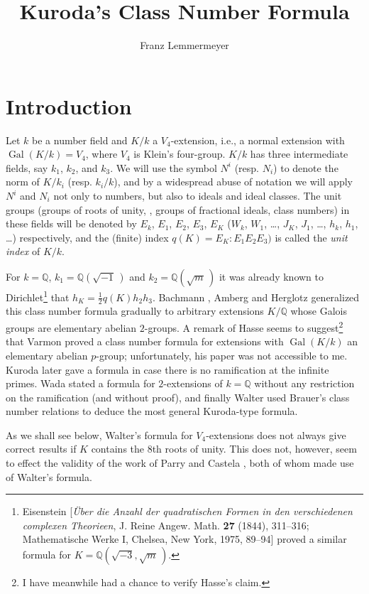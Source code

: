 \documentclass{amsart}
\title{Kuroda's Class Number Formula}
\author{Franz Lemmermeyer}
\newcommand{\Q}{\mathbb Q}
\newcommand{\Gal}{\operatorname{Gal}}
\begin{document}
\maketitle

\section*{Introduction}
Let $k$ be a number field and $K/k$ a $V_4$-extension, i.e., a normal
extension with $\Gal(K/k) = V_4$, where $V_4$ is Klein's four-group.
$K/k$ has three intermediate fields, say $k_1$, $k_2$, and $k_3$. We
will use the symbol $N^i$ (resp. $N_i$) to denote the norm of $K/k_i$
(resp. $k_i/k$), and by a widespread abuse of notation we will apply
$N^i$ and $N_i$ not only to numbers, but also to ideals and ideal
classes. The unit groups (groups of roots of unity, , groups of
fractional ideals, class numbers) in these fields will be denoted by
$E_k$, $E_1$, $E_2$, $E_3$, $E_K$ ($W_k$, $W_1$, \ldots,
$J_K$, $J_1$, \ldots, $h_k$, $h_1$, \ldots) respectively, and
the (finite) index $q(K) = E_K : E_1E_2E_3)$ is called the
{\em unit index} of $K/k$.

For $k = \Q$, $k_1 = \Q(\sqrt{-1}\,)$ and $k_2 = \Q(\sqrt{m}\,)$
it was already known to Dirichlet\footnote{Eisenstein [{\em \"Uber 
die Anzahl der quadratischen Formen in den verschiedenen complexen 
Theorieen}, J. Reine Angew. Math. {\bf 27} (1844), 311--316; 
Mathematische Werke I, Chelsea, New York, 1975, 89--94]
proved a similar formula for $K = \Q(\sqrt{-3},\sqrt{m}\,)$.}
\cite{Dir} that $h_K = \frac12 q(K) h_2h_3$.  Bachmann \cite{Ba},
Amberg \cite{Am} and Herglotz \cite{Her} generalized this class
number formula gradually to arbitrary extensions $K/\Q$ whose
Galois groups are elementary abelian $2$-groups.  A remark of
Hasse \cite[p. 3]{Has} seems to suggest\footnote{I have
meanwhile had a chance to verify Hasse's claim.} that
Varmon \cite{Var} proved a class number formula for extensions
with $\Gal(K/k)$ an elementary abelian $p$-group; unfortunately,
his paper was not accessible to me. Kuroda \cite{Kur2} later gave
a formula in case there is no ramification at the infinite primes.
Wada \cite{Wad} stated a formula for $2$-extensions of $k = \Q$
without any restriction on the ramification (and without proof),
and finally Walter \cite{Wal} used Brauer's class number relations
to deduce the most general Kuroda-type formula.

As we shall see below, Walter's formula for $V_4$-extensions does
not always give correct results if $K$ contains the $8$th roots
of unity. This does not, however, seem to effect the validity of
the work of Parry \cite{Par1,Par2} and Castela \cite{Cas}, both
of whom made use of Walter's formula.
\end{document}

